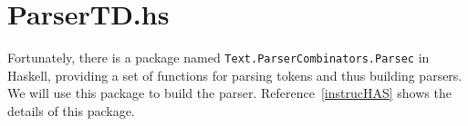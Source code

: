 

%

\section{ParserTD.hs}
Fortunately, there is a package named {\tt Text.ParserCombinators.Parsec} in Haskell, providing a set of functions for parsing tokens and thus building parsers. We will use this package to build the parser. Reference~\ref{instrucHAS} shows the details of this package.

